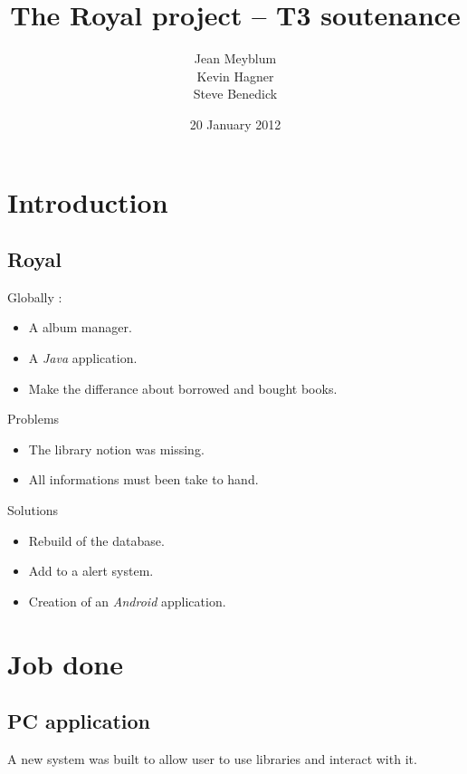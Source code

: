\documentclass{beamer}
\title[T3 soutenance -- T306AMOA]{The Royal project -- T3 soutenance}
\author[Jean, Kevin \& Steve]{Jean Meyblum \\ Kevin Hagner \\ Steve Benedick}
\institute{IUT Robert Schuman}
\date{20 January 2012}
\begin{document}
\section{Introduction}
\subsection{Royal}
\begin{frame}
\titlepage
\end{frame}

\begin{frame}
\begin{center}
Globally : 
\begin{itemize}
\pause \item A album manager.
\pause \item A \emph{Java} application.
\pause \item Make the differance about borrowed and bought books. 
\end{itemize}
\end{center}
\end{frame}

\begin{frame}
\begin{block}{Problems}
\begin{itemize}
\pause \item The library notion was missing.
\pause \item All informations must been take to hand.
\end{itemize}
\end{block}
\pause 
\begin{block}{Solutions}
\begin{itemize}
\pause \item Rebuild of the database.
\pause \item Add to a alert system.
\pause \item Creation of an \emph{Android} application.
\end{itemize}
\end{block}
\end{frame}

\section{Job done}
\subsection{PC application}
\begin{frame}
\begin{center}
A new system was built to allow user to use libraries and interact with it.
\end{center}
\end{frame}
\end{document}
